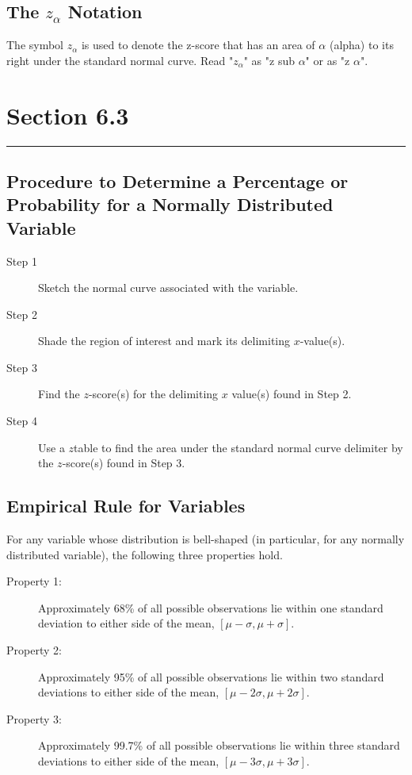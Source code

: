 \documentclass[12pt]{article}
\begin{document}
        \subsection*{The $z_\alpha$ Notation}
            The symbol $z_\alpha$ is used to denote the z-score that has an area of $\alpha$ (alpha)
            to its right under the standard normal curve. Read "$z_\alpha$" as "z sub $\alpha$" or
            as "z $\alpha$".

    
    \section[]{Section 6.3}
    \noindent\rule{\textwidth}{0.4pt}
        \subsection*{Procedure to Determine a Percentage or Probability for a Normally Distributed
        Variable}
            \begin{description}
                \item[Step 1] Sketch the normal curve associated with the variable.
                \item[Step 2] Shade the region of interest and mark its delimiting $x$-value(s).
                \item[Step 3] Find the $z$-score(s) for the delimiting $x$ value(s) found in Step 2.
                \item[Step 4] Use a $z$table to find the area under the standard normal curve
                delimiter by the $z$-score(s) found in Step 3.               
            \end{description}
        \subsection*{Empirical Rule for Variables}
            For any variable whose distribution is bell-shaped (in particular, for any normally
            distributed variable), the following three properties hold.
            \begin{description}
                \item[Property 1:] Approximately 68\% of all possible observations lie within one
                standard deviation to either side of the mean, $[\mu - \sigma, \mu + \sigma]$.
                \item[Property 2:] Approximately 95\% of all possible observations lie within two
                standard deviations to either side of the mean, $[\mu - 2\sigma, \mu + 2\sigma]$. 
                \item[Property 3:] Approximately 99.7\% of all possible observations lie within
                three standard deviations to either side of the mean, 
                $[\mu - 3\sigma, \mu + 3\sigma]$.                
            \end{description}
\end{document}
